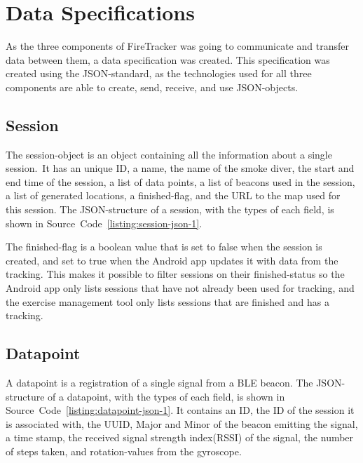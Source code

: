 \documentclass[../Main/thesis.tex]{subfiles}
\begin{document}
\section{Data Specifications}
As the three components of FireTracker was going to communicate and transfer data between them, a data specification was created.
This specification was created using the JSON-standard, as the technologies used for all three components are able to create, send, receive, and use JSON-objects.

\subsection{Session}
The session-object is an object containing all the information about a single session.\
It has an unique ID, a name, the name of the smoke diver, the start and end time of the session, a list of data points, a list of beacons used in the session, a list of generated locations, a finished-flag, and the URL to the map used for this session. 
The JSON-structure of a session, with the types of each field, is shown in Source~Code~\ref{listing:session-json-1}.


The finished-flag is a boolean value that is set to false when the session is created, and set to true when the Android app updates it with data from the tracking.
This makes it possible to filter sessions on their finished-status so the Android app only lists sessions that have not already been used for tracking, and the exercise management tool only lists sessions that are finished and has a tracking.

\subsection{Datapoint}
A datapoint is a registration of a single signal from a BLE beacon.
The JSON-structure of a datapoint, with the types of each field, is shown in Source~Code~\ref{listing:datapoint-json-1}.
It contains an ID, the ID of the session it is associated with, the UUID, Major and Minor of the beacon emitting the signal, a time stamp, the received signal strength index(RSSI) of the signal, the number of steps taken, and rotation-values from the gyroscope.
\end{document}

